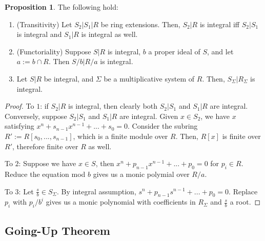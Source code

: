 \documentclass{article}
\theoremstyle{definition}
\theoremstyle{definition}
\theoremstyle{definition}
\newtheorem{proposition}{Proposition}[section]
\theoremstyle{definition}
\theoremstyle{definition}
\theoremstyle{definition}
\theoremstyle{definition}
\begin{document}
\begin{tcolorbox}[colback=blue!5!white,colframe=blue!30!white]
\begin{proposition}
The following hold:
\begin{enumerate}
    \item (Transitivity) Let $S_2|S_1|R$ be ring extensions. Then, $S_2|R$ is integral iff $S_2|S_1$ is integral and $S_1|R$ is integral as well.
    \item (Functoriality) Suppose $S|R$ is integral, $b$ a proper ideal of $S$, and let $a:=b\cap R$. Then $S/b|R/a$ is integral.
    \item Let $S|R$ be integral, and $\Sigma$ be a multiplicative system of $R$. Then, $S_{\Sigma}|R_{\Sigma}$ is integral.
\end{enumerate}
\end{proposition}
\end{tcolorbox}
\begin{proof}
    To $1$: if $S_2|R$ is integral, then clearly both $S_2|S_1$ and $S_1| R$ are integral. Conversely, suppose $S_2|S_1$ and $S_1|R$ are integral. Given $x\in S_2$, we have $x$ satisfying $x^n+s_{n-1}x^{n-1}+...+s_0=0$. Consider the subring $R':=R[s_0,...,s_{n-1}]$, which is a finite module over $R$. Then, $R[x]$ is finite over $R'$, therefore finite over $R$ as well.

    To $2$: Suppose we have $x\in S$, then $x^n+p_{n-1}x^{n-1}+...+p_0=0$ for $p_i\in R$. Reduce the equation mod $b$ gives us a monic polymial over $R/a$. 
    
    To $3$: Let $\frac{s}{b}\in S_{\Sigma}$. By integral assumption, $s^n+p_{n-1}s^{n-1}+...+p_0=0$. Replace $p_i$ with $p_i/b^i$ gives us a monic polynomial with coefficients in $R_{\Sigma}$ and $\frac{s}{b}$ a root.
\end{proof}


\subsection{Going-Up Theorem}
\end{document}
